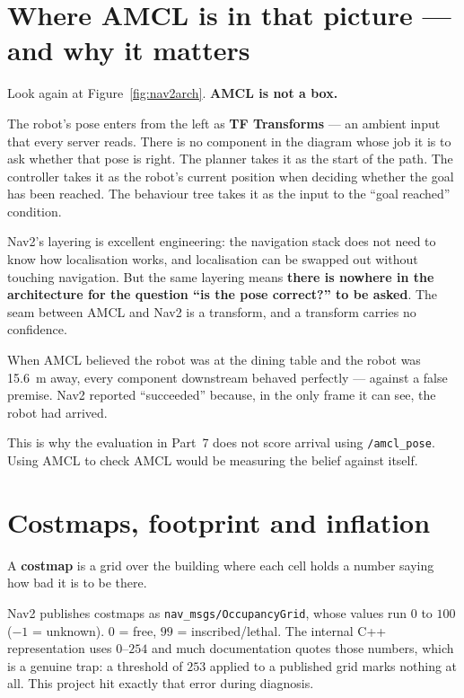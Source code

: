 \documentclass[11pt,a4paper]{report}
\newcommand{\term}[1]{\textcolor{rust}{\textbf{#1}}}
\newcommand{\file}[1]{\texttt{\small #1}}
\begin{document}
\section{Where AMCL is in that picture --- and why it matters}

Look again at Figure~\ref{fig:nav2arch}. \textbf{AMCL is not a box.}

The robot's pose enters from the left as \textbf{TF Transforms} --- an ambient
input that every server reads. There is no component in the diagram whose job
it is to ask whether that pose is right. The planner takes it as the start of
the path. The controller takes it as the robot's current position when deciding
whether the goal has been reached. The behaviour tree takes it as the input to
the ``goal reached'' condition.

\begin{keyidea}
Nav2's layering is excellent engineering: the navigation stack does not need
to know how localisation works, and localisation can be swapped out without
touching navigation. But the same layering means \textbf{there is nowhere in
the architecture for the question ``is the pose correct?'' to be asked}. The
seam between AMCL and Nav2 is a transform, and a transform carries no
confidence.

When AMCL believed the robot was at the dining table and the robot was
\SI{15.6}{\metre} away, every component downstream behaved perfectly ---
against a false premise. Nav2 reported ``succeeded'' because, in the only frame
it can see, the robot had arrived.
\end{keyidea}

This is why the evaluation in Part~7 does not score arrival using
\file{/amcl\_pose}. Using AMCL to check AMCL would be measuring the belief
against itself.

\section{Costmaps, footprint and inflation}

A \term{costmap} is a grid over the building where each cell holds a number
saying how bad it is to be there.

\begin{warnbox}
Nav2 publishes costmaps as \file{nav\_msgs/OccupancyGrid}, whose values run
$0$ to $100$ ($-1$ = unknown). $0$ = free, $99$ = inscribed/lethal. The
internal C++ representation uses $0$--$254$ and much documentation quotes those
numbers, which is a genuine trap: a threshold of $253$ applied to a published
grid marks nothing at all. This project hit exactly that error during
diagnosis.
\end{warnbox}
\end{document}
